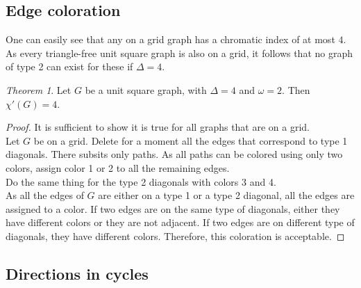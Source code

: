 \documentclass[12pt]{article}
\theoremstyle{definition}
\theoremstyle{remark}
\newtheorem{theorem}{Theorem}[section]
\begin{document}
\subsection{Edge coloration}

One can easily see that any on a grid graph has a chromatic index of at most $4$. As every triangle-free unit square graph is also on a grid, 
it follows that no graph of type 2 can exist for these if $\Delta = 4$.

\begin{theorem}
    Let $G$ be a unit square graph, with $\Delta = 4$ and $\omega = 2$. Then $\chi'(G) = 4$.
\end{theorem}

\begin{proof}
    It is sufficient to show it is true for all graphs that are on a grid. \\
    Let $G$ be on a grid. Delete for a moment all the edges that correspond to type 1 diagonals. There subsits only paths. 
    As all paths can be colored using only two colors, assign color 1 or 2 to all the remaining edges. \\
    Do the same thing for the type 2 diagonals with colors 3 and 4. \\
    As all the edges of $G$ are either on a type 1 or a type 2 diagonal, all the edges are assigned to a color. If two edges are on the same type of diagonals, either they
    have different colors or they are not adjacent. If two edges are on different type of diagonals, they have different colors. Therefore, this coloration is acceptable.
\end{proof}

\subsection{Directions in cycles}
\end{document}
